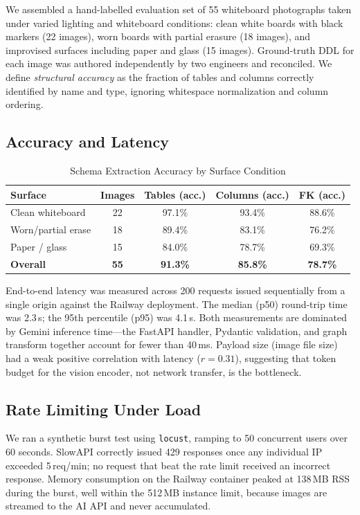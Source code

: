 \documentclass[conference]{IEEEtran}
\begin{document}
We assembled a hand-labelled evaluation set of 55 whiteboard
photographs taken under varied lighting and whiteboard conditions:
clean white boards with black markers (22 images), worn boards
with partial erasure (18 images), and improvised surfaces including
paper and glass (15 images). Ground-truth DDL for each image was
authored independently by two engineers and reconciled. We define
\emph{structural accuracy} as the fraction of tables and columns
correctly identified by name and type, ignoring whitespace
normalization and column ordering.

\subsection{Accuracy and Latency}

\begin{table}[htbp]
\caption{Schema Extraction Accuracy by Surface Condition}
\label{tab:accuracy}
\centering
\begin{tabular}{@{}lcccc@{}}
\toprule
Surface & Images & Tables (acc.) & Columns (acc.) & FK (acc.) \\
\midrule
Clean whiteboard & 22 & 97.1\% & 93.4\% & 88.6\% \\
Worn/partial erase & 18 & 89.4\% & 83.1\% & 76.2\% \\
Paper / glass & 15 & 84.0\% & 78.7\% & 69.3\% \\
\midrule
\textbf{Overall} & \textbf{55} & \textbf{91.3\%} & \textbf{85.8\%} & \textbf{78.7\%} \\
\bottomrule
\end{tabular}
\end{table}

End-to-end latency was measured across 200 requests issued
sequentially from a single origin against the Railway deployment.
The median (p50) round-trip time was 2.3\,s; the 95th percentile
(p95) was 4.1\,s. Both measurements are dominated by Gemini
inference time---the FastAPI handler, Pydantic validation, and
graph transform together account for fewer than 40\,ms. Payload
size (image file size) had a weak positive correlation with
latency ($r = 0.31$), suggesting that token budget for the vision
encoder, not network transfer, is the bottleneck.

\subsection{Rate Limiting Under Load}

We ran a synthetic burst test using \texttt{locust}, ramping to
50 concurrent users over 60 seconds. SlowAPI correctly issued
429 responses once any individual IP exceeded 5\,req/min;
no request that beat the rate limit received an incorrect
response. Memory consumption on the Railway container peaked at
138\,MB RSS during the burst, well within the 512\,MB instance
limit, because images are streamed to the AI API and never
accumulated.
\end{document}
